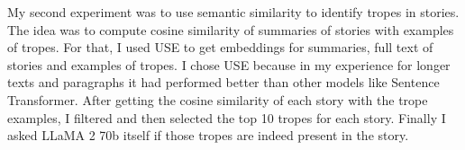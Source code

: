 \documentclass[11pt]{article}
\begin{document}
\begin{table}[H]
\end{table}
\vspace{-2em}
\begin{table}[H]
  
\end{table}
My second experiment was to use semantic similarity to identify tropes in stories. The idea was to compute cosine similarity of summaries of stories with examples of tropes. For that, I used USE\cite{cer_2018_universal} to get embeddings for summaries, full text of stories and examples of tropes. 
I chose USE because in my experience for longer texts and paragraphs it had performed better than other models like Sentence Transformer. After getting the cosine similarity of each story with the trope examples, I filtered and then selected the top 10 tropes for each story. Finally I asked LLaMA 2 70b itself if those tropes are indeed present in the story.
\end{document}
